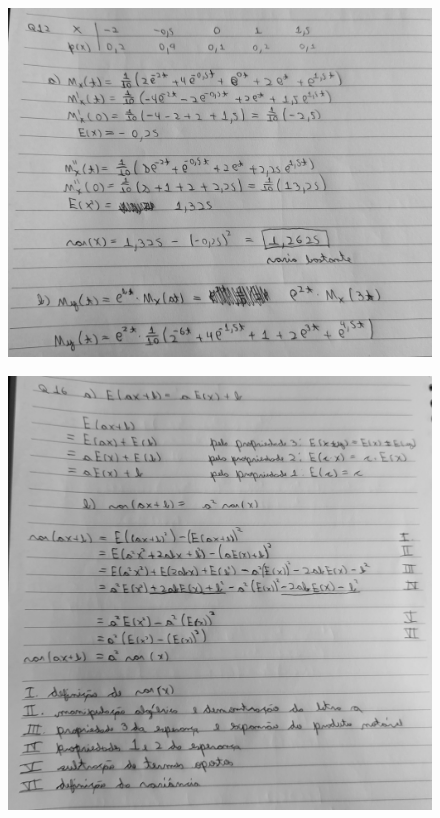 \documentclass[12pt]{article}
\begin{document}
	\begin{figure}[h!]
		\includegraphics[scale=0.37]{q12}
	\end{figure}
\vspace{+12pt}	

	\begin{figure}[h!]
		\includegraphics[scale=0.43]{q16}
	\end{figure}
\end{document}
